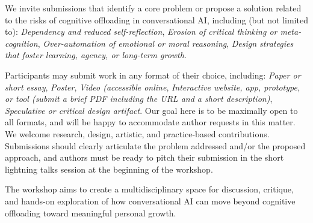 \documentclass[manuscript,screen,review]{acmart}
\begin{document}


\begin{framed}
\footnotesize


We invite submissions that identify a core problem or propose a solution related to the risks of cognitive offloading in conversational AI, including (but not limited to): \textit{Dependency and reduced self-reflection}, \textit{Erosion of critical thinking or meta-cognition}, \textit{Over-automation of emotional or moral reasoning}, \textit{Design strategies that foster learning, agency, or long-term growth}.

Participants may submit work in any format of their choice, including: \textit{Paper or short essay}, \textit{Poster}, \textit{Video (accessible online}, \textit{Interactive website, app, prototype, or tool (submit a brief PDF including the URL and a short description)}, \textit{Speculative or critical design artifact}. 
Our goal here is to be maximally open to all formats, and will be happy to accommodate author requests in this matter.
We welcome research, design, artistic, and practice-based contributions. 
Submissions should clearly articulate the problem addressed and/or the proposed approach, and authors must be ready to pitch their submission in the short lightning talks session at the beginning of the workshop.

The workshop aims to create a multidisciplinary space for discussion, critique, and hands-on exploration of how conversational AI can move beyond cognitive offloading toward meaningful personal growth.
\end{framed}
\end{document}

